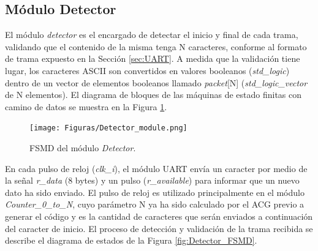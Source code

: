 \subsection{Módulo Detector}
	\label{sec:detector}
	
	El módulo \textit{detector} es el encargado de detectar el inicio y final de cada trama, validando que el contenido de la misma tenga N caracteres, conforme al formato de trama expuesto en la Sección \ref{sec:UART}. A medida que la validación tiene lugar, los caracteres ASCII son convertidos en valores booleanos (\textit{std\_logic}) dentro de un vector de elementos booleanos llamado \textit{packet}[N] (\textit{std\_logic\_vector} de N elementos). El diagrama de bloques de las máquinas de estado finitas con camino de datos se muestra en la Figura \ref{fig:Detector_module}.
	
	\begin{figure}[H]
		\centering
		\texttt{[image: Figuras/Detector\_module.png]}
		\centering\caption{FSMD del módulo \textit{Detector}.}
		\label{fig:Detector_module}
	\end{figure}
	
	En cada pulso de reloj (\textit{clk\_i}), el módulo UART envía un caracter por medio de la señal \textit{r\_data} (8 bytes) y un pulso (\textit{r\_available}) para informar que un nuevo dato ha sido enviado. El pulso de reloj es utilizado principalmente en el módulo \textit{Counter\_0\_to\_N}, cuyo parámetro N ya ha sido calculado por el ACG previo a generar el código y es la cantidad de caracteres que serán enviados a continuación del caracter de inicio. El proceso de detección y validación de la trama recibida se describe el diagrama de estados de la Figura \ref{fig:Detector_FSMD}.
	
